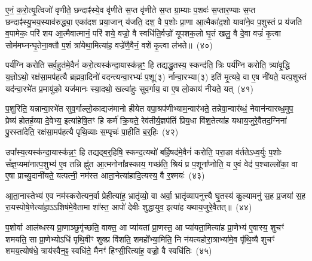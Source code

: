 ए॒नं॒ क॒रो॒त्यृ॒त्विजो॑ वृणीते॒ छन्दाꣴ॑स्ये॒व वृ॑णीते स॒प्त वृ॑णीते स॒प्त ग्रा॒म्याः प॒शवः॑ स॒प्तार॒ण्याः स॒प्त छन्दाꣴ॑स्यु॒भय॒स्याव॑रुद्ध्या॒ एका॑\-दश प्रया॒जान् य॑जति॒ दश॒ वै प॒शोः प्रा॒णा आ॒त्मैका॑द॒शो यावा॑ने॒व प॒शुस्तं प्र य॑जति व॒पामेकः॒ परि॑ शय आ॒त्मैवात्मानं॒ परि॑ शये॒ वज्रो॒ वै स्वधि॑ति॒र्वज्रो॑ यूपशक॒लो घृ॒तं खलु॒ वै दे॒वा वज्रं॑ कृ॒त्वा सोम॑मघ्नन्घृ॒तेना॒क्तौ प॒शं त्रा॑येथा॒मित्या॑ह॒ वज्रे॑णै॒वैनं॒ वशे॑ कृ॒त्वा ल॑भते॥~(४०)\ip

{\anuvakamend[{आ॒घा॒रं प॑द्यन्ते॒ द्वाद॑शा॒त्मन्ने॒व य॒ज्ञस्य॒ मेध्य॑मे॒व खलु॒ वा अ॒ष्टाद॑श च}]}

पर्य॑ग्नि करोति सर्व॒हुत॑मे॒वैनं॑ करो॒त्यस्क॑न्दा॒यास्क॑न्न॒ꣳ॒ हि तद्यद्धु॒तस्य॒ स्कन्द॑ति॒ त्रिः पर्य॑ग्नि करोति॒ त्र्या॑वृ॒द्धि य॒ज्ञो\-ऽथो॒ रक्ष॑सा॒मप॑हत्यै ब्रह्मवा॒दिनो॑ वदन्त्यन्वा॒रभ्यः॑ प॒शू(३) र्नान्वा॒रभ्या(३) इति॑ मृ॒त्यवे॒ वा ए॒ष नी॑यते॒ यत्प॒शुस्तं यद॑न्वा॒रभे॑त प्र॒मायु॑को॒ यज॑मानः स्या॒दथो॒ खल्वा॑हुः सुव॒र्गाय॒ वा ए॒ष लो॒काय॑ नीयते॒ यत्~(४१)\ip

प॒शुरिति॒ यन्नान्वा॒रभे॑त सुव॒र्गाल्लो॒काद्यज॑मानो हीयेत वपा॒श्रप॑णीभ्याम॒न्वार॑भते॒ तन्नेवा॒न्वार॑ब्धं॒ नेवान॑न्वारब्ध॒मुप॒ प्रेष्य॑ होतर्\mbox{}ह॒व्या दे॒वेभ्य॒ इत्या॑हेषि॒तꣳ हि कर्म॑ क्रि॒यते॒ रेव॑तीर्य॒ज्ञप॑तिं प्रिय॒धा वि॑श॒तेत्या॑ह यथाय॒जुरे॒वैतद॒ग्निना॑ पु॒रस्ता॑देति॒ रक्ष॑सा॒मप॑हत्यै पृथि॒व्याः स॒म्पृचः॑ पा॒हीति॑ ब॒र्॒\mbox{}हिः~(४२)\ip

उपा᳚स्य॒त्यस्क॑न्दा॒यास्क॑न्न॒ꣳ॒ हि तद्यद्ब॒र्॒\mbox{}हिषि॒ स्कन्द॒त्यथो॑ बर्\mbox{}हि॒षद॑मे॒वैनं॑ करोति॒ परा॒ङा व॑र्तते\-ऽध्व॒र्युः प॒शोः सं᳚ज्ञ॒प्यमा॑नात्प॒शुभ्य॑ ए॒व तन्नि ह्नु॑त आ॒त्मनोना᳚व्रस्काय॒ गच्छ॑ति॒ श्रियं प्र प॒शूना᳚प्नोति॒ य ए॒वं वेद॑ प॒श्चाल्लो॑का॒ वा ए॒षा प्राच्यु॒दानी॑यते॒ यत्पत्नी॒ नम॑स्त आता॒नेत्या॑हादि॒त्यस्य॒ वै र॒श्मयः॑~(४३)\ip

आ॒ता॒नास्तेभ्य॑ ए॒व नम॑स्करोत्यन॒र्वा प्रेहीत्या॑ह॒ भ्रातृ॑व्यो॒ वा अर्वा॒ भ्रातृ॑व्यापनुत्त्यै घृ॒तस्य॑ कु॒ल्यामनु॑ स॒ह प्र॒जया॑ स॒ह रा॒यस्पोषे॒णेत्या॑हा॒\-ऽऽ\-शिष॑मे॒वैतामा शा᳚स्त॒ आपो॑ देवीः शुद्धायुव॒ इत्या॑ह यथाय॒जुरे॒वैतत्॥~(४४)\ip

{\anuvakamend[{लो॒काय॑ नीयते॒ यद्ब॒र्॒\mbox{}ही र॒श्मयः॑ स॒प्तत्रिꣳ॑शच्च}]}

प॒शोर्वा आल॑ब्धस्य प्रा॒णाञ्छुगृ॑च्छति॒ वाक्त॒ आ प्या॑यतां प्रा॒णस्त॒ आ प्या॑यता॒मित्या॑ह प्रा॒णेभ्य॑ ए॒वास्य॒ शुचꣳ॑ शमयति॒ सा प्रा॒णेभ्यो\-ऽधि॑ पृथि॒वीꣳ शुक्प्र वि॑शति॒ शमहो᳚भ्या॒मिति॒ नि न॑यत्यहोरा॒त्राभ्या॑मे॒व पृ॑थि॒व्यै शुचꣳ॑ शमय॒त्योष॑धे॒ त्राय॑स्वैन॒ꣴ॒ स्वधि॑ते॒ मैनꣳ॑ हिꣳसी॒रित्या॑ह॒ वज्रो॒ वै स्वधि॑तिः~(४५)\ip

